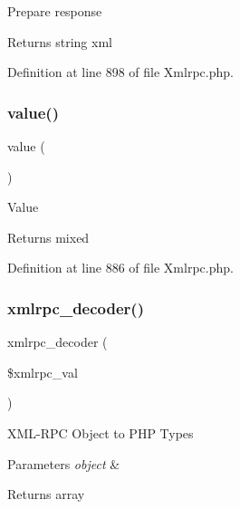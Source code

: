 Prepare response

\begin{DoxyReturn}{Returns}
string xml 
\end{DoxyReturn}


Definition at line 898 of file Xmlrpc.\+php.

\mbox{\label{class_x_m_l___r_p_c___response_aefbfa229f1c9e1fc967bff724a010f9e}} 
\subsubsection{\texorpdfstring{value()}{value()}}
{\footnotesize\ttfamily value (\begin{DoxyParamCaption}{ }\end{DoxyParamCaption})}

Value

\begin{DoxyReturn}{Returns}
mixed 
\end{DoxyReturn}


Definition at line 886 of file Xmlrpc.\+php.

\mbox{\label{class_x_m_l___r_p_c___response_a44f453c58a4aad3ccb76dd9926f9fa64}} 
\subsubsection{\texorpdfstring{xmlrpc\_decoder()}{xmlrpc\_decoder()}}
{\footnotesize\ttfamily xmlrpc\+\_\+decoder (\begin{DoxyParamCaption}\item[{}]{\$xmlrpc\+\_\+val }\end{DoxyParamCaption})}

X\+M\+L-\/\+R\+PC Object to P\+HP Types


\begin{DoxyParams}{Parameters}
{\em object} & \\
\hline
\end{DoxyParams}
\begin{DoxyReturn}{Returns}
array 
\end{DoxyReturn}


